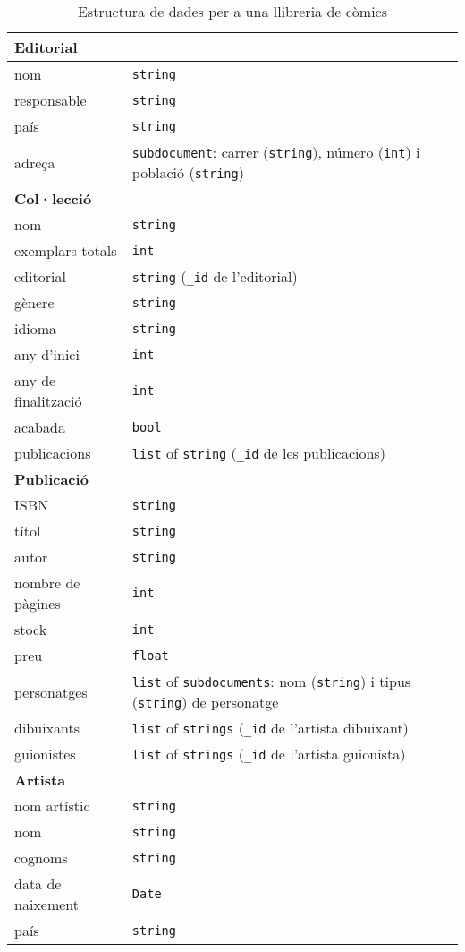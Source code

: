\documentclass{article}
\begin{document}
\begin{table}[htbp]
\centering
\caption{Estructura de dades per a una llibreria de còmics}
\label{tab:estructura_dades}
\begin{tabularx}{\textwidth}{lX}
\toprule
\textbf{Editorial} & \\
\midrule
nom & \texttt{string} \\
responsable & \texttt{string} \\
pa\'is & \texttt{string} \\
adreça & \texttt{subdocument}: carrer (\texttt{string}), n\'umero (\texttt{int}) i poblaci\'o (\texttt{string})\\
\midrule
\textbf{Col·lecció} & \\
\midrule
nom & \texttt{string} \\
exemplars totals & \texttt{int} \\
editorial & \texttt{string} (\texttt{\_id} de l'editorial) \\
gènere & \texttt{string} \\
idioma & \texttt{string} \\
any d'inici & \texttt{int} \\
any de finalització & \texttt{int} \\
acabada & \texttt{bool} \\
publicacions & \texttt{list} of \texttt{string} (\texttt{\_id} de les publicacions) \\
\midrule
\textbf{Publicació} & \\
\midrule
ISBN & \texttt{string} \\
títol & \texttt{string} \\
autor & \texttt{string} \\
nombre de pàgines & \texttt{int} \\
stock & \texttt{int} \\
preu & \texttt{float} \\
personatges & \texttt{list} of \texttt{subdocuments}: nom (\texttt{string}) i tipus (\texttt{string}) de personatge \\
dibuixants & \texttt{list} of \texttt{strings} (\texttt{\_id} de l'artista dibuixant)\\
guionistes & \texttt{list} of \texttt{strings} (\texttt{\_id} de l'artista guionista)\\
\midrule
\textbf{Artista} & \\
\midrule
nom artístic & \texttt{string} \\
nom & \texttt{string} \\
cognoms & \texttt{string} \\
data de naixement & \texttt{Date} \\
país & \texttt{string} \\
\bottomrule
\end{tabularx}
\end{table}
\end{document}
